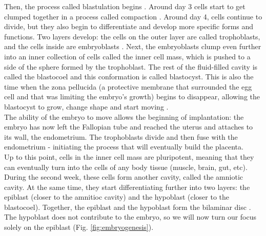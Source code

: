 Then, the process called blastulation begins \cite{wong2010non}.
Around day 3 cells start to get clumped together in a process called compaction \cite{iwata2014analysis}.
Around day 4, cells continue to divide, but they also begin to differentiate and develop more specific forms and functions.
Two layers develop: the cells on the outer layer are called trophoblasts, and the cells inside are embryoblasts
\cite{petropoulos2016single, niakan2013analysis}. 
Next, the embryoblasts clump even further into an inner collection of cells called the inner cell mass, which is pushed to a side of the sphere formed by the trophoblast.
The rest of the fluid-filled cavity is called the blastocoel and this conformation is called blastocyst.
This is also the time when the zona pellucida (a protective membrane that surrounded the egg cell and that was limiting the embryo's growth) begins to disappear, allowing the blastocyst to grow, change shape and start moving \cite{larsen2001human}.\\

The ability of the embryo to move allows the beginning of implantation: the embryo has now left the Fallopian tube and reached the uterus and attaches to its wall, the endometrium.
The trophoblasts divide and then fuse with the endometrium -
initiating the process that 
will eventually build the placenta.\\

Up to this point, cells in the inner cell mass are pluripotent, meaning that they can eventually turn into the cells of any body tissue (muscle, brain, gut, etc). 
During the second week, these cells form another cavity, called the amniotic cavity. 
At the same time, they start differentiating further into two layers: the epiblast (closer to the amnitioc cavity) and the hypoblast (closer to the blastocoel). 
Together, the epiblast and the hypoblast form the bilaminar disc \cite{hertig1956description}.
The hypoblast does not contribute to the embryo, so we will now turn our focus solely on the epiblast (Fig. \ref{fig:embryogenesis}).\\

